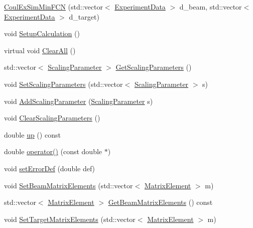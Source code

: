 \begin{DoxyCompactItemize}
\item 
\hyperlink{classCoulExSimMinFCN_a5b602166e9869a3315d91240688ff80b}{Coul\-Ex\-Sim\-Min\-F\-C\-N} (std\-::vector$<$ \hyperlink{classExperimentData}{Experiment\-Data} $>$ d\-\_\-beam, std\-::vector$<$ \hyperlink{classExperimentData}{Experiment\-Data} $>$ d\-\_\-target)
\item 
void \hyperlink{classCoulExSimMinFCN_a584bcdd3162825e43cdcc0da22dcf660}{Setup\-Calculation} ()
\item 
virtual void \hyperlink{classCoulExSimMinFCN_aa0e58dc75991c9f36e6a2a3a3903e871}{Clear\-All} ()
\item 
std\-::vector$<$ \hyperlink{classScalingParameter}{Scaling\-Parameter} $>$ \hyperlink{classCoulExSimMinFCN_ab9931a7ed07fa4a7b7c6240f1523ae77}{Get\-Scaling\-Parameters} ()
\item 
void \hyperlink{classCoulExSimMinFCN_ae6e4bc6eccbbe9eebc19eca5aac0c612}{Set\-Scaling\-Parameters} (std\-::vector$<$ \hyperlink{classScalingParameter}{Scaling\-Parameter} $>$ s)
\item 
void \hyperlink{classCoulExSimMinFCN_a8c6a26b2bc120e1c845adf86856b6e99}{Add\-Scaling\-Parameter} (\hyperlink{classScalingParameter}{Scaling\-Parameter} s)
\item 
void \hyperlink{classCoulExSimMinFCN_ad9c9c9c24cf7c0ec512efb90f1e57171}{Clear\-Scaling\-Parameters} ()
\item 
double \hyperlink{classCoulExSimMinFCN_a3a7709814a0321eb500aa2056c15955b}{up} () const 
\item 
double \hyperlink{classCoulExSimMinFCN_a8f7a5104de4feeb3ecfd39bf5408977b}{operator()} (const double $\ast$)
\item 
void \hyperlink{classCoulExSimMinFCN_a66e6a927e0a90264c55e3706e4f7e82f}{set\-Error\-Def} (double def)
\item 
void \hyperlink{classCoulExSimMinFCN_ab4682f12d74fb9f8080226c41cffcbc0}{Set\-Beam\-Matrix\-Elements} (std\-::vector$<$ \hyperlink{classMatrixElement}{Matrix\-Element} $>$ m)
\item 
std\-::vector$<$ \hyperlink{classMatrixElement}{Matrix\-Element} $>$ \hyperlink{classCoulExSimMinFCN_a668d4496698438c05c8fffc1b9a3793f}{Get\-Beam\-Matrix\-Elements} () const 
\item 
void \hyperlink{classCoulExSimMinFCN_a5a4a4f1cdfbe0e4c9c9822e1744036a2}{Set\-Target\-Matrix\-Elements} (std\-::vector$<$ \hyperlink{classMatrixElement}{Matrix\-Element} $>$ m)
\item 

\end{DoxyCompactItemize}
